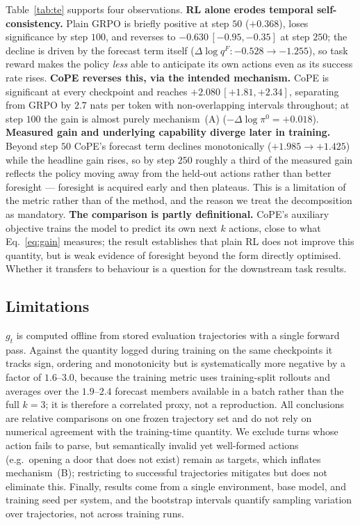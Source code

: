 Table~\ref{tab:te} supports four observations.
\textbf{RL alone erodes temporal self-consistency.} Plain GRPO is briefly positive at
step $50$ ($+0.368$), loses significance by step $100$, and reverses to
$-0.630\,[-0.95,-0.35]$ at step $250$; the decline is driven by the forecast term
itself ($\Delta\log q^{F}\!: -0.528 \rightarrow -1.255$), so task reward makes the
policy \emph{less} able to anticipate its own actions even as its success rate rises.
\textbf{CoPE reverses this, via the intended mechanism.} CoPE is significant at every
checkpoint and reaches $+2.080\,[+1.81,+2.34]$, separating from GRPO by $2.7$ nats per
token with non-overlapping intervals throughout; at step $100$ the gain is almost
purely mechanism~(A) ($-\Delta\log\pi^{0} = +0.018$).
\textbf{Measured gain and underlying capability diverge later in training.} Beyond
step $50$ CoPE's forecast term declines monotonically ($+1.985 \rightarrow +1.425$)
while the headline gain rises, so by step $250$ roughly a third of the measured gain
reflects the policy moving away from the held-out actions rather than better
foresight --- foresight is acquired early and then plateaus. This is a limitation of
the metric rather than of the method, and the reason we treat the decomposition as
mandatory.
\textbf{The comparison is partly definitional.} CoPE's auxiliary objective trains the
model to predict its own next $k$ actions, close to what Eq.~\eqref{eq:gain} measures;
the result establishes that plain RL does not improve this quantity, but is weak
evidence of foresight beyond the form directly optimised. Whether it transfers to
behaviour is a question for the downstream task results.

\subsection{Limitations}
\label{sec:te-limitations}

$g_t$ is computed offline from stored evaluation trajectories with a single forward
pass. Against the quantity logged during training on the same checkpoints it tracks
sign, ordering and monotonicity but is systematically more negative by a factor of
$1.6$--$3.0$, because the training metric uses training-split rollouts and averages
over the $1.9$--$2.4$ forecast members available in a batch rather than the full
$k=3$; it is therefore a correlated proxy, not a reproduction. All conclusions are
relative comparisons on one frozen trajectory set and do not rely on numerical
agreement with the training-time quantity. We exclude turns whose action fails to
parse, but semantically invalid yet well-formed actions (e.g.\ opening a door that
does not exist) remain as targets, which inflates mechanism~(B); restricting to
successful trajectories mitigates but does not eliminate this. Finally, results come
from a single environment, base model, and training seed per system, and the bootstrap
intervals quantify sampling variation over trajectories, not across training runs.
